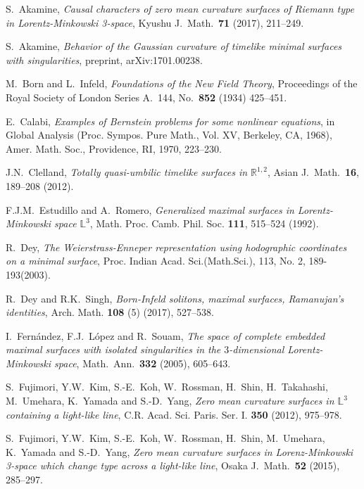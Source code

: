 \documentclass[12pt,amstex]{amsart}%
\theoremstyle{plain} %
\theoremstyle{definition}
\begin{document}
\begin{thebibliography}{99}
S.~Akamine, \emph{Causal characters of zero mean curvature surfaces of Riemann type in Lorentz-Minkowski 3-space}, Kyushu J.\ Math.\ {\bf 71} (2017), 211--249.

 S.~Akamine, \emph{Behavior of the Gaussian curvature of timelike minimal surfaces with singularities}, preprint, arXiv:1701.00238.

M.~Born and L.~Infeld, \emph{Foundations of the New Field Theory}, Proceedings of the Royal Society of London Series A.\ 144, No.\ {\bf 852} (1934) 425--451.

E.~Calabi, 
\emph{Examples of Bernstein problems for some nonlinear equations}, in Global Analysis (Proc. Sympos. Pure Math., Vol. XV, Berkeley, CA, 1968), Amer. Math. Soc., Providence, RI, 1970, 223--230.

  J.N.~Clelland, 
  \emph{Totally quasi-umbilic timelike surfaces in $\mathbb{R}^{1,2}$},
  Asian J.\ Math.\ {\bf 16}, 189--208 (2012).

F.J.M.~Estudillo and A.~Romero, 
\emph{Generalized maximal surfaces in Lorentz-Minkowski space $\mathbb{L}^3$}, Math. Proc. Camb. Phil. Soc. {\bf 111}, 515--524 (1992).

 R.~Dey, \emph{The Weierstrass-Enneper representation using hodographic coordinates on a minimal surface}, Proc. Indian Acad. Sci.(Math.Sci.), 113, No. 2, 189-193(2003).

R.~Dey and R.K.~Singh, 
\emph{Born-Infeld solitons, maximal surfaces, Ramanujan's identities}, Arch. Math. {\bf 108} (5) (2017), 527--538.

I.\ Fern\'{a}ndez, F.J.\ L\'opez and R.\ Souam, 
 \emph{The space of complete embedded maximal surfaces with isolated singularities in the $3$-dimensional Lorentz-Minkowski space}, Math.\ Ann.\ {\bf 332} (2005), 605--643.

S.~Fujimori, Y.W.~Kim, S.-E.~Koh, W.~Rossman, H.~Shin, H.~Takahashi, M.~Umehara, K.~Yamada and S.-D.~Yang, \emph{Zero mean curvature surfaces in $\mathbb{L}^3$ containing a light-like line}, C.R. Acad. Sci. Paris. Ser. I. {\bf 350} (2012), 975--978.

S.~Fujimori, Y.W.~Kim, S.-E.~Koh, W.~Rossman, H.~Shin, M.~Umehara, K.~Yamada and S.-D.~Yang, \emph{Zero mean curvature surfaces in Lorenz-Minkowski 3-space which change type across a light-like line}, Osaka J.\ Math.\ {\bf 52} (2015), 285--297.


\end{thebibliography}
\end{document}
